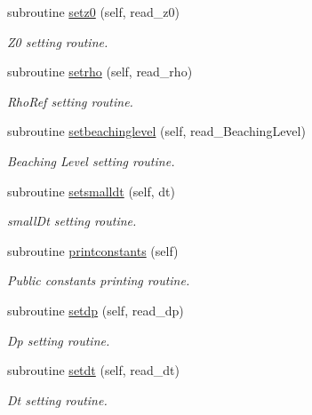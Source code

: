 \begin{DoxyCompactItemize}
subroutine \mbox{\hyperlink{namespacesimulationglobals__mod_a36c2833caae3767434115cc966fe2c5d}{setz0}} (self, read\+\_\+z0)
\begin{DoxyCompactList}\small\item\em Z0 setting routine. \end{DoxyCompactList}\item 
subroutine \mbox{\hyperlink{namespacesimulationglobals__mod_a7d41fc05216d326ae8c0b090362430d3}{setrho}} (self, read\+\_\+rho)
\begin{DoxyCompactList}\small\item\em Rho\+Ref setting routine. \end{DoxyCompactList}\item 
subroutine \mbox{\hyperlink{namespacesimulationglobals__mod_a3b24d0338ee34782c8e2ab57bba7b5f6}{setbeachinglevel}} (self, read\+\_\+\+Beaching\+Level)
\begin{DoxyCompactList}\small\item\em Beaching Level setting routine. \end{DoxyCompactList}\item 
subroutine \mbox{\hyperlink{namespacesimulationglobals__mod_ad36c21a592a3230ce848804075abc97e}{setsmalldt}} (self, dt)
\begin{DoxyCompactList}\small\item\em small\+Dt setting routine. \end{DoxyCompactList}\item 
subroutine \mbox{\hyperlink{namespacesimulationglobals__mod_a139cb36f8366e6aec875c7977235fd68}{printconstants}} (self)
\begin{DoxyCompactList}\small\item\em Public constants printing routine. \end{DoxyCompactList}\item 
subroutine \mbox{\hyperlink{namespacesimulationglobals__mod_afda1e73e6e0cd075875c70aded99d425}{setdp}} (self, read\+\_\+dp)
\begin{DoxyCompactList}\small\item\em Dp setting routine. \end{DoxyCompactList}\item 
subroutine \mbox{\hyperlink{namespacesimulationglobals__mod_a0eced3f4367d08f3d0cb6ef2044bdc56}{setdt}} (self, read\+\_\+dt)
\begin{DoxyCompactList}\small\item\em Dt setting routine. \end{DoxyCompactList}\item 

\end{DoxyCompactItemize}

